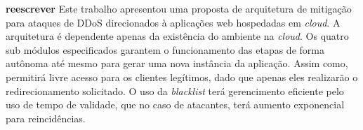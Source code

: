 \textbf{reescrever}
Este trabalho apresentou uma proposta de arquitetura de mitigação para ataques de DDoS direcionados à aplicações web hospedadas em \emph{cloud}. A arquitetura é dependente apenas da existência do ambiente na \emph{cloud}. Os quatro sub módulos especificados garantem o funcionamento das etapas de forma autônoma até mesmo para gerar uma nova instância da aplicação. Assim como, permitirá livre acesso para os clientes legítimos, dado que apenas eles realizarão o redirecionamento solicitado. O uso da \emph{blacklist} terá gerencimento eficiente pelo uso de tempo de validade, que no caso de atacantes, terá aumento exponencial para reincidências.

